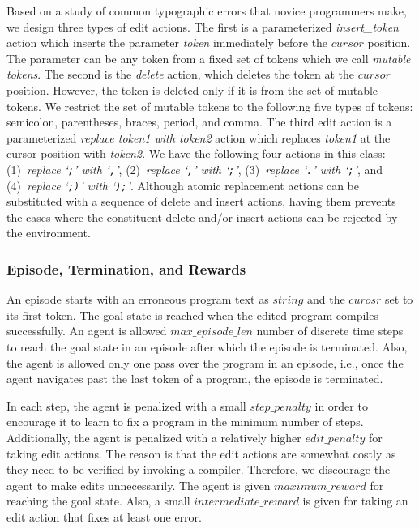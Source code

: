 \documentclass{article}
\newcommand{\code}[1]{\texttt{#1}}
\begin{document}
Based on a study of common typographic errors that novice programmers
make, we design three types of edit actions.
The first is a parameterized \emph{insert\_token} action which inserts the parameter \emph{token} immediately before the $ cursor $ position.
The parameter can be any token from a fixed set of tokens which we call \emph{mutable tokens}.
The second is the \emph{delete} action, which deletes the token at the $ cursor $ position.
However, the token is deleted only if it is from the set of mutable tokens.
We restrict the set of mutable tokens to the following five types
of tokens: semicolon, parentheses, braces, period, and comma.
The third edit action is a parameterized \emph{replace token1 with token2} action which replaces \emph{token1} at the cursor position with \emph{token2}. We have the following four actions in this class: (1)~\emph{replace `\code{;}' with `\code{,}'},
(2)~\emph{replace `\code{,}' with `\code{;}'},
(3)~\emph{replace `\code{.}' with `\code{;}'}, and (4)~\emph{replace `\code{;)}' with `\code{);}'}.
Although atomic replacement actions can be substituted with a sequence of delete and insert actions, having them prevents the cases where the constituent delete and/or insert actions can be rejected by the environment.

\subsubsection{Episode, Termination, and Rewards} An episode starts with an erroneous program text as $ string $ and the $ curosr $ set to its first token. 
The goal state is reached when the edited program compiles successfully.
An agent is allowed $ max\_episode\_len $ number of discrete time steps to reach the goal state in an episode after which the episode is terminated. 
Also, the agent is allowed only one pass over the program in an episode, i.e., once the agent navigates past the last token of a program, the episode is terminated. 

In each step, the agent is penalized with a small $ step\_penalty $ in order to encourage it to learn to fix a program in the minimum number of steps.
Additionally, the agent is penalized with a relatively higher $ edit\_penalty $ for taking edit actions.
The reason is that the edit actions are somewhat costly as they need to be verified by invoking a compiler. Therefore, we discourage the agent to make edits unnecessarily.
The agent is given $maximum\_reward$ for reaching the goal state.
Also, a small $ intermediate\_reward $ is given for taking an edit action that fixes at least one error.
\end{document}
